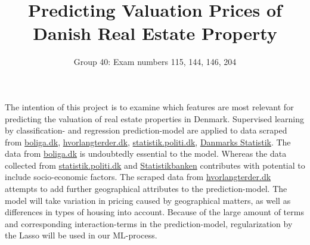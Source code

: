 \documentclass[12pt,a4paper]{article}
\begin{document}
\title{Predicting Valuation Prices of Danish Real Estate Property} 

\author{Group 40: Exam numbers 115, 144, 146, 204}
\maketitle
\section*{}
The intention of this project is to examine which features are most relevant for predicting the valuation of real estate properties in Denmark. Supervised learning by classification- and regression prediction-model are applied to data scraped from \href{https://www.boliga.dk}{boliga.dk}, \href{https://www.hvorlangterder.dk}{hvorlangterder.dk}, \href{https://statistik.politi.dk/QvAJAXZfc/opendoc.htm?document=QlikApplication%2F2999_Public\%2FPublic_IndsatsResultater.qvw}{statistik.politi.dk},
 \href{https://www.dst.dk/da/Statistik/emner/befolkning-og-valg}{Danmarks Statistik}.
The data from \href{https://www.boliga.dk}{boliga.dk} is undoubtedly essential to the model. Whereas the data collected from \href{https://statistik.politi.dk/QvAJAXZfc/opendoc.htm?document=QlikApplication%2F2999_Public\%2FPublic_IndsatsResultater.qvw}{statistik.politi.dk} 
and \href{https://statistikbanken.dk/statbank5a/default.asp?w=1280}{Statistikbanken} contributes with potential to include socio-economic factors. The scraped data from \href{https://www.hvorlangterder.dk}{hvorlangterder.dk} attempts to add further geographical attributes to the prediction-model. \newline
The model will take variation in pricing caused by geographical matters, as well as differences in types of housing into account.
Because of the large amount of terms and corresponding interaction-terms in the prediction-model, regularization by the Lasso will be used in our ML-process. 
\end{document}
